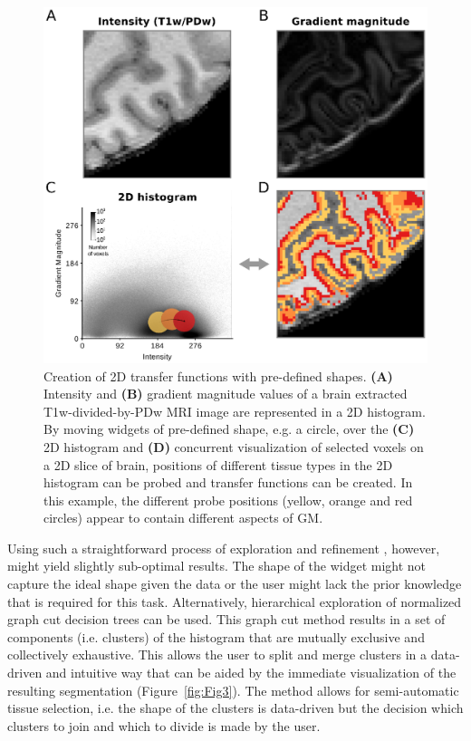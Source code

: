 \begin{figure}[htb!]
\centering
\includegraphics[width=\textwidth]{figures/chapter_02/figure_2.eps}
\caption{Creation of 2D transfer functions with pre-defined shapes. \textbf{(A)} Intensity and \textbf{(B)} gradient magnitude values of a brain extracted T1w-divided-by-PDw MRI image are represented in a 2D histogram. By moving widgets of pre-defined shape, e.g. a circle, over the \textbf{(C)} 2D histogram and \textbf{(D)} concurrent visualization of selected voxels on a 2D slice of brain, positions of different tissue types in the 2D histogram can be probed and transfer functions can be created. In this example, the different probe positions (yellow, orange and red circles) appear to contain different aspects of GM.}
\label{fig:Fig2}
\end{figure}

Using such a straightforward process of exploration and refinement \parencite{Kniss2002}, however, might yield slightly sub-optimal results. The shape of the widget might not capture the ideal shape given the data or the user might lack the prior knowledge that is required for this task. Alternatively, hierarchical exploration of normalized graph cut decision trees \parencite{Ip2012} can be used. This graph cut method results in a set of components (i.e. clusters) of the histogram that are mutually exclusive and collectively exhaustive. This allows the user to split and merge clusters in a data-driven and intuitive way that can be aided by the immediate visualization of the resulting segmentation (Figure~\ref{fig:Fig3}). The method allows for semi-automatic tissue selection, i.e. the shape of the clusters is data-driven but the decision which clusters to join and which to divide is made by the user.

